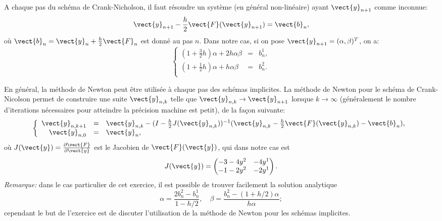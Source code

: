 \documentclass[11pt]{article}
\begin{document}
\begin{Answer}[ref={ex:1}]
\Question
A chaque pas du sch\'ema de Crank-Nicholson, il faut r\'esoudre un syst\`eme
(en g\'en\'eral non-lin\'eaire) ayant $\vect{y}_{n+1}$ comme inconnue:
$$
\vect{y}_{n+1} - \frac{h}{2} \vect{F}(\vect{y}_{n+1})  =  \vect{b}_n,
$$
o\`u $\vect{b}_n = \vect{y}_n  + \frac{h}{2} \vect{F}_n $ est donn\'e au pas $n$.
Dans notre cas, si on pose $\vect{y}_{n+1} = (\alpha, \beta)^T$, on a:
$$
\left\{
\begin{array}{lcl}
(1 + \frac{3}{2}h) \alpha  + 2 h \alpha \beta  & = & b^1_n, \\
(1 + \frac{1}{2}h) \alpha  +   h \alpha \beta  & = & b^2_n. \\
\end{array}\right.
$$

 \Question
 En g\'en\'eral, la m\'ethode de Newton peut \^etre utilis\'ee
 \`a chaque pas des sch\'emas implicites.
 La m\'ethode de Newton pour le sch\'ema de Crank-Nicolson
 permet de construire une suite $\vect{y}_{n,k}$ telle que
 $\vect{y}_{n,k} \to \vect{y}_{n+1}$ lorsque $k \to \infty$
 (g\'en\'eralement le nombre d'iterations n\'ecessaires pour
 atteindre la pr\'ecision machine est petit), de la
 fa\c con suivante:
 $$
 \left\{
 \begin{array}{rcl}
 \vect{y}_{n,k+1} & = & \vect{y}_{n,k} -  (I - \frac{h}{2}J(\vect{y}_{n,k}))^{-1}
 (\vect{y}_{n,k} - \frac{h}{2} \vect{F}(\vect{y}_{n,k}) - \vect{b}_n), \\
 \vect{y}_{n,0} & = & \vect{y}_n,
 \end{array}\right.
 $$
 o\`u $J(\vect{y}) = \frac{\partial \vect{F}}{\partial \vect{y}}$ est le
 Jacobien de $\vect{F}(\vect{y})$, qui dans notre cas est
 $$
 J(\vect{y}) =
 \begin{pmatrix}
 -3  -4 y^2 & - 4 y^1 \\
 -1 -2 y^2 & -2 y^1
 \end{pmatrix}.
 $$
 {\it Remarque:} dans le cas particulier de cet exercice, il est possible de
trouver facilement la solution analytique
 $$
 \alpha = \frac{2b_n^2 - b_n^1}{1 - h/2}, \quad \beta = \frac{b_n^2 - ( 1 + h/2) \alpha}{h \alpha};
 $$
 cependant le but de l'exercice est de discuter l'utilisation de la m\'ethode
 de Newton pour les sch\'emas implicites.



\end{Answer}
\end{document}
